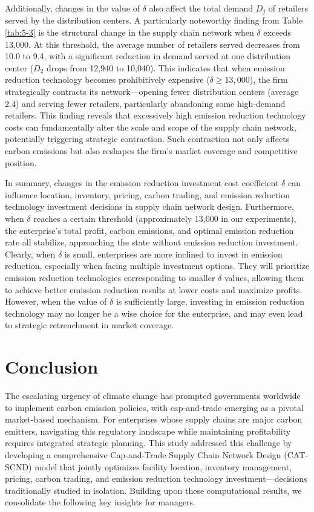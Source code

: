 \documentclass[]{article}
\theoremstyle{plain}%
\theoremstyle{definition}
\theoremstyle{remark}
\theoremstyle{plain}%
\begin{document}
Additionally, changes in the value of $\delta$ also affect the total demand $D_j$ of retailers served by the distribution centers. A particularly noteworthy finding from Table \ref{tab:5-3} is the structural change in the supply chain network when $\delta$ exceeds 13,000. At this threshold, the average number of retailers served decreases from 10.0 to 9.4, with a significant reduction in demand served at one distribution center ($D_2$ drops from 12,940 to 10,040). This indicates that when emission reduction technology becomes prohibitively expensive ($\delta \geq 13,000$), the firm strategically contracts its network—opening fewer distribution centers (average 2.4) and serving fewer retailers, particularly abandoning some high-demand retailers. This finding reveals that excessively high emission reduction technology costs can fundamentally alter the scale and scope of the supply chain network, potentially triggering strategic contraction. Such contraction not only affects carbon emissions but also reshapes the firm's market coverage and competitive position.

In summary, changes in the emission reduction investment cost coefficient $\delta$ can influence location, inventory, pricing, carbon trading, and emission reduction technology investment decisions in supply chain network design. Furthermore, when $\delta$ reaches a certain threshold (approximately 13,000 in our experiments), the enterprise's total profit, carbon emissions, and optimal emission reduction rate all stabilize, approaching the state without emission reduction investment. Clearly, when $\delta$ is small, enterprises are more inclined to invest in emission reduction, especially when facing multiple investment options. They will prioritize emission reduction technologies corresponding to smaller $\delta$ values, allowing them to achieve better emission reduction results at lower costs and maximize profits. However, when the value of $\delta$ is sufficiently large, investing in emission reduction technology may no longer be a wise choice for the enterprise, and may even lead to strategic retrenchment in market coverage.


    
    
\section{Conclusion}

The escalating urgency of climate change has prompted governments worldwide to implement carbon emission policies, with cap-and-trade emerging as a pivotal market-based mechanism. For enterprises whose supply chains are major carbon emitters, navigating this regulatory landscape while maintaining profitability requires integrated strategic planning. This study addressed this challenge by developing a comprehensive Cap-and-Trade Supply Chain Network Design (CAT-SCND) model that jointly optimizes facility location, inventory management, pricing, carbon trading, and emission reduction technology investment—decisions traditionally studied in isolation.
Building upon these computational results, we consolidate the following key insights for managers.
\end{document}
